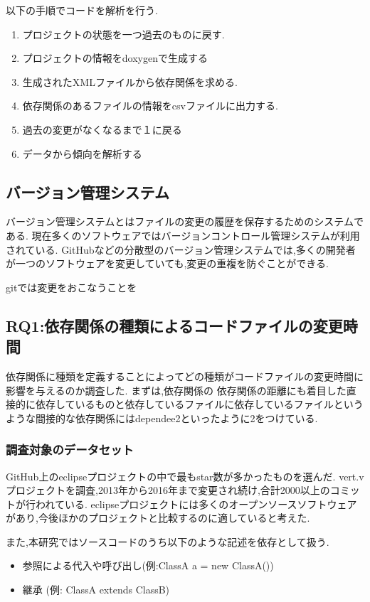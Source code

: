 \documentclass{jsarticle}
\begin{document}
以下の手順でコードを解析を行う.
\begin{enumerate}
\item プロジェクトの状態を一つ過去のものに戻す.
\item プロジェクトの情報をdoxygenで生成する
\item 生成されたXMLファイルから依存関係を求める.
\item 依存関係のあるファイルの情報をcsvファイルに出力する.
\item 過去の変更がなくなるまで１に戻る
\item データから傾向を解析する
\end{enumerate}


\subsection{バージョン管理システム}
バージョン管理システムとはファイルの変更の履歴を保存するためのシステムである.
現在多くのソフトウェアではバージョンコントロール管理システムが利用されている.
GitHubなどの分散型のバージョン管理システムでは,多くの開発者が一つのソフトウェアを変更していても,変更の重複を防ぐことができる.

gitでは変更をおこなうことを


\subsection{RQ1:依存関係の種類によるコードファイルの変更時間}
依存関係に種類を定義することによってどの種類がコードファイルの変更時間に影響を与えるのか調査した.
まずは,依存関係の
依存関係の距離にも着目した直接的に依存しているものと依存しているファイルに依存しているファイルというような間接的な依存関係にはdependee2といったように2をつけている.


\subsubsection{調査対象のデータセット}
GitHub上のeclipseプロジェクトの中で最もstar数が多かったものを選んだ.
vert.vプロジェクトを調査,2013年から2016年まで変更され続け,合計2000以上のコミットが行われている.
eclipseプロジェクトには多くのオープンソースソフトウェアがあり,今後ほかのプロジェクトと比較するのに適していると考えた.

また,本研究ではソースコードのうち以下のような記述を依存として扱う.
\begin{itemize}
\item 参照による代入や呼び出し(例:ClassA a = new ClassA())
\item 継承 (例: ClassA extends ClassB)
\end{itemize}
\end{document}
